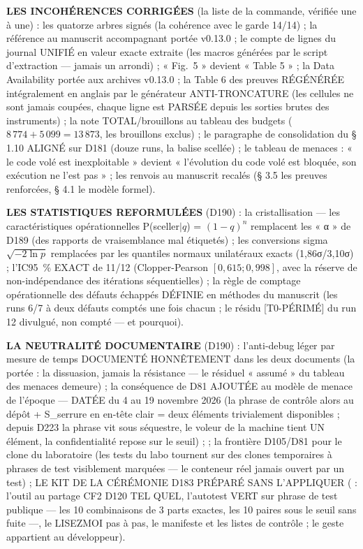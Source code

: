 \textbf{LES INCOHÉRENCES CORRIGÉES} (la liste de la commande, vérifiée une à
une) : les quatorze arbres signés (la cohérence avec le garde 14/14) ; la
référence au manuscrit accompagnant portée v0.13.0 ; le compte de lignes du
journal UNIFIÉ en valeur exacte extraite (les macros générées par le script
d'extraction — jamais un arrondi) ; « Fig.~5 » devient « Table 5 » ; la Data
Availability portée aux archives v0.13.0 ; la Table 6 des preuves RÉGÉNÉRÉE
intégralement en anglais par le générateur ANTI-TRONCATURE (les cellules ne
sont jamais coupées, chaque ligne est PARSÉE depuis les sorties brutes des
instruments) ; la note TOTAL/brouillons au tableau des budgets ($8\,774 +
5\,099 = 13\,873$, les brouillons exclus) ; le paragraphe de consolidation
du § 1.10 ALIGNÉ sur D181 (douze runs, la balise  scellée) ;
le tableau de menaces : « le code volé est inexploitable » devient
« l'évolution du code volé est bloquée, son exécution ne l'est pas » ; les
renvois au manuscrit recalés (§ 3.5 les preuves renforcées, § 4.1 le modèle
formel).

\textbf{LES STATISTIQUES REFORMULÉES} (D190) : la cristallisation — les
caractéristiques opérationnelles P(sceller$|q$) = $(1-q)^n$ remplacent les
« α » de D189 (des rapports de vraisemblance mal étiquetés) ; les conversions
sigma $\sqrt{-2\ln p}$ remplacées par les quantiles normaux unilatéraux
exacts (1,86σ/3,10σ) ; l'IC95~\% EXACT de 11/12 (Clopper-Pearson
$[0,615 ; 0,998]$, avec la réserve de non-indépendance des itérations
séquentielles) ; la règle de comptage opérationnelle des défauts échappés
DÉFINIE en méthodes du manuscrit (les runs 6/7 à deux défauts comptés une
fois chacun ; le résidu [T0-PÉRIMÉ] du run 12 divulgué, non compté — et
pourquoi).

\textbf{LA NEUTRALITÉ DOCUMENTAIRE} (D190) : l'anti-debug léger par mesure
de temps DOCUMENTÉ HONNÊTEMENT dans les deux documents (la portée : la
dissuasion, jamais la résistance — le résiduel « assumé » du tableau des
menaces demeure) ; la conséquence de D81 AJOUTÉE au modèle de menace de l'époque —
DATÉE du 4 au 19 novembre 2026 (la phrase de contrôle alors au dépôt +
S\_serrure en en-tête clair = deux éléments trivialement disponibles ;
depuis D223 la phrase vit sous séquestre, le voleur de la machine tient
UN élément, la confidentialité repose sur le seuil) ; ; la frontière D105/D81 pour le clone du laboratoire (les tests
du labo tournent sur des clones temporaires à phrases de test visiblement
marquées — le conteneur réel jamais ouvert par un test) ; LE KIT DE LA
CÉRÉMONIE D183 PRÉPARÉ SANS L'APPLIQUER ( :
l'outil au partage CF2 D120 TEL QUEL, l'autotest VERT sur phrase de test
publique — les 10 combinaisons de 3 parts exactes, les 10 paires sous le
seuil sans fuite —, le LISEZMOI pas à pas, le manifeste et les listes de
contrôle ; le geste appartient au développeur).

